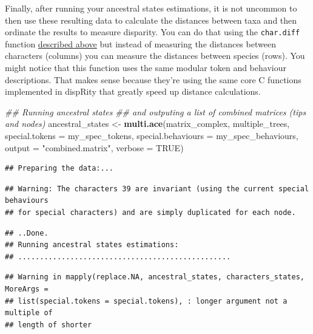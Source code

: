 \documentclass[
]{book}
\newenvironment{Shaded}{\begin{snugshade}}{\end{snugshade}}
\newcommand{\CommentTok}[1]{\textcolor[rgb]{0.56,0.35,0.01}{\textit{#1}}}
\newcommand{\DataTypeTok}[1]{\textcolor[rgb]{0.13,0.29,0.53}{#1}}
\newcommand{\KeywordTok}[1]{\textcolor[rgb]{0.13,0.29,0.53}{\textbf{#1}}}
\newcommand{\NormalTok}[1]{#1}
\newcommand{\OtherTok}[1]{\textcolor[rgb]{0.56,0.35,0.01}{#1}}
\newcommand{\StringTok}[1]{\textcolor[rgb]{0.31,0.60,0.02}{#1}}
\begin{document}
Finally, after running your ancestral states estimations, it is not uncommon to then use these resulting data to calculate the distances between taxa and then ordinate the results to measure disparity.
You can do that using the \texttt{char.diff} function \protect\hyperlink{char.diff}{described above} but instead of measuring the distances between characters (columns) you can measure the distances between species (rows).
You might notice that this function uses the same modular token and behaviour descriptions.
That makes sense because they're using the same core C functions implemented in dispRity that greatly speed up distance calculations.

\begin{Shaded}
\begin{Highlighting}[]
\CommentTok{\#\# Running ancestral states}
\CommentTok{\#\# and outputing a list of combined matrices (tips and nodes)}
\NormalTok{ancestral\_states \textless{}{-}}\StringTok{ }\KeywordTok{multi.ace}\NormalTok{(matrix\_complex, multiple\_trees,}
                              \DataTypeTok{special.tokens =}\NormalTok{ my\_spec\_tokens,}
                              \DataTypeTok{special.behaviours =}\NormalTok{ my\_spec\_behaviours,}
                              \DataTypeTok{output =} \StringTok{"combined.matrix"}\NormalTok{,}
                              \DataTypeTok{verbose =} \OtherTok{TRUE}\NormalTok{)}
\end{Highlighting}
\end{Shaded}

\begin{verbatim}
## Preparing the data:...
\end{verbatim}

\begin{verbatim}
## Warning: The characters 39 are invariant (using the current special behaviours
## for special characters) and are simply duplicated for each node.
\end{verbatim}

\begin{verbatim}
## ..Done.
## Running ancestral states estimations:
## .................................................
\end{verbatim}

\begin{verbatim}
## Warning in mapply(replace.NA, ancestral_states, characters_states, MoreArgs =
## list(special.tokens = special.tokens), : longer argument not a multiple of
## length of shorter
\end{verbatim}
\end{document}
